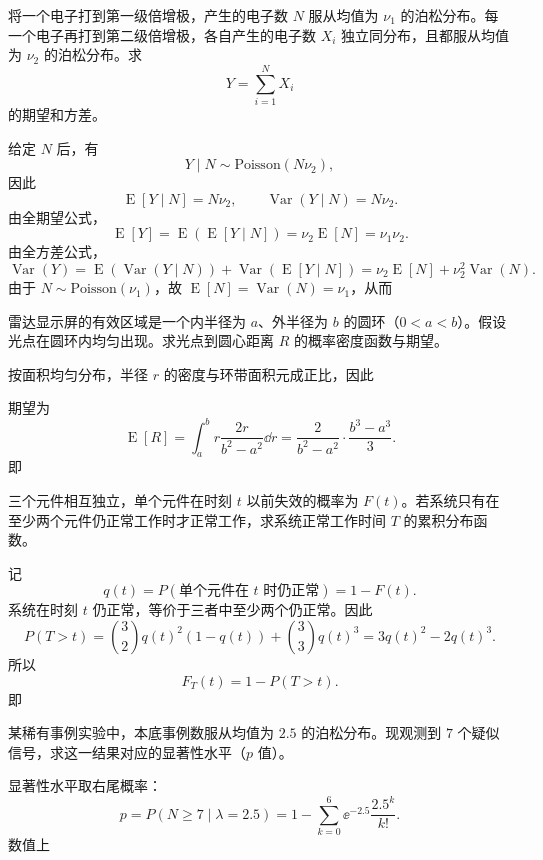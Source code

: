 \begin{question}
将一个电子打到第一级倍增极，产生的电子数 $N$ 服从均值为 $\nu_1$ 的泊松分布。每一个电子再打到第二级倍增极，各自产生的电子数 $X_i$ 独立同分布，且都服从均值为 $\nu_2$ 的泊松分布。求
\[
Y=\sum_{i=1}^{N}X_i
\]
的期望和方差。
\begin{solution}
给定 $N$ 后，有
\[
Y\mid N\sim \mathrm{Poisson}(N\nu_2),
\]
因此
\[
\operatorname{E}[Y\mid N]=N\nu_2,\qquad \operatorname{Var}(Y\mid N)=N\nu_2.
\]
由全期望公式，
\[
\operatorname{E}[Y]=\operatorname{E}(\operatorname{E}[Y\mid N])=\nu_2\operatorname{E}[N]=\nu_1\nu_2.
\]
由全方差公式，
\[
\operatorname{Var}(Y)=\operatorname{E}(\operatorname{Var}(Y\mid N))+\operatorname{Var}(\operatorname{E}[Y\mid N])
=\nu_2\operatorname{E}[N]+\nu_2^2\operatorname{Var}(N).
\]
由于 $N\sim \mathrm{Poisson}(\nu_1)$，故 $\operatorname{E}[N]=\operatorname{Var}(N)=\nu_1$，从而
\end{solution}
\end{question}

\begin{question}
雷达显示屏的有效区域是一个内半径为 $a$、外半径为 $b$ 的圆环（$0<a<b$）。假设光点在圆环内均匀出现。求光点到圆心距离 $R$ 的概率密度函数与期望。
\begin{solution}
按面积均匀分布，半径 $r$ 的密度与环带面积元成正比，因此

期望为
\[
\operatorname{E}[R]=\int_a^b r\frac{2r}{b^2-a^2}\dd{r}
=\frac{2}{b^2-a^2}\cdot \frac{b^3-a^3}{3}.
\]
即
\end{solution}
\end{question}

\begin{question}
三个元件相互独立，单个元件在时刻 $t$ 以前失效的概率为 $F(t)$。若系统只有在至少两个元件仍正常工作时才正常工作，求系统正常工作时间 $T$ 的累积分布函数。
\begin{solution}
记
\[
q(t)=P(\text{单个元件在 }t\text{ 时仍正常})=1-F(t).
\]
系统在时刻 $t$ 仍正常，等价于三者中至少两个仍正常。因此
\[
P(T>t)=\binom32 q(t)^2(1-q(t))+\binom33 q(t)^3
=3q(t)^2-2q(t)^3.
\]
所以
\[
F_T(t)=1-P(T>t).
\]
即
\end{solution}
\end{question}

\begin{question}
某稀有事例实验中，本底事例数服从均值为 $2.5$ 的泊松分布。现观测到 $7$ 个疑似信号，求这一结果对应的显著性水平（$p$ 值）。
\begin{solution}
显著性水平取右尾概率：
\[
p=P(N\ge 7\mid \lambda=2.5)
=1-\sum_{k=0}^{6}\ee^{-2.5}\frac{2.5^k}{k!}.
\]
数值上
\end{solution}
\end{question}

